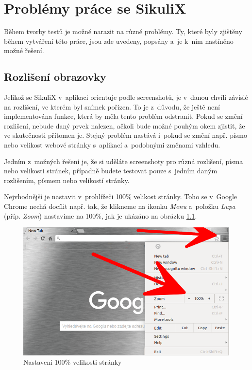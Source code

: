 \chapter{Problémy práce se SikuliX}
Během tvorby testů je možné narazit na různé problémy. Ty, které byly zjištěny během vytváření této práce, jsou zde uvedeny, popsány a~je k~nim nastíněno možné řešení.

	\section{Rozlišení obrazovky}
	Jelikož se SikuliX v~aplikaci orientuje podle screenshotů, je v~danou chvíli závislé na rozlišení, ve kterém byl snímek pořízen. To je z~důvodu, že ještě není implementována funkce, která by měla tento problém odstranit. Pokud se změní rozlišení, nebude daný prvek nalezen, ačkoli bude možné pouhým okem zjistit, že ve skutečnosti přítomen je. Stejný problém nastává i~pokud se změní např. písmo nebo velikost webové stránky s~aplikací a~podobnými změnami vzhledu.
	
	Jedním z~možných řešení je, že si uděláte screenshoty pro různá rozlišení, písma nebo velikosti stránek, případně budete testovat pouze s~jedním daným rozlišením, písmem nebo velikostí stránky.
	
	Nejvhodnější je nastavit v~prohlížeči 100\% velikost stránky. Toho se v~Google Chrome nechá docílit např. tak, že klikneme na ikonku \emph{Menu} a~položku \emph{Lupa} (příp. \emph{Zoom}) nastavíme na 100\%, jak je ukázáno na obrázku \ref{zoom}.
	
	\begin{figure}[ht!]
		\centering
		\caption{Nastavení 100\% velikosti stránky}
		\label{zoom}
		\includegraphics[width=12.5cm]{img/Chyby/zoom.png}
	\end{figure}
	
